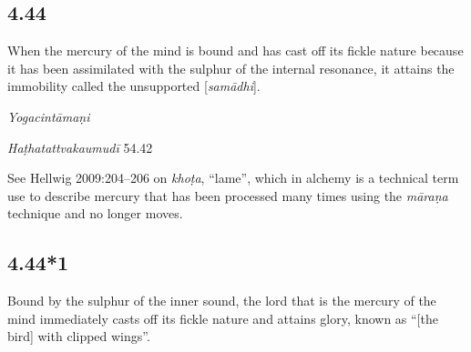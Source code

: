 \begin{ekdosis}
\subsection*{4.44}
\begin{translation}[hp04_044]
When the mercury of the mind is bound and has cast off its fickle nature because it has been assimilated with the sulphur of the internal resonance, it attains the immobility called the unsupported [\textit{samādhi}].
\end{translation}


\begin{testimonia}[hp04_044]
\emph{Yogacintāmaṇi}
\begin{versinnote}
\end{versinnote}

\emph{Haṭhatattvakaumudī} 54.42
\begin{versinnote}
\end{versinnote}
\end{testimonia}

\begin{philcomm}[hp04_044]
See Hellwig 2009:204–206 on \emph{khoṭa}, “lame”, which in alchemy is a technical term use to describe mercury that has been processed many times using the \emph{māraṇa} technique and no longer moves.
\end{philcomm}

\subsection*{4.44*1}
\begin{translation}[hp04_044_1]
Bound by the sulphur of the inner sound, the lord that is the mercury of the mind immediately casts off its fickle nature and attains glory, known as “[the bird] with clipped wings”.
\end{translation}



\end{ekdosis}
